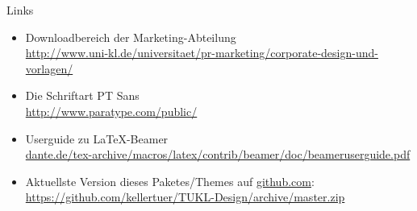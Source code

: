 \documentclass[german,10pt,xcolor=colortbl,compress
]{beamer}
\begin{document}
	\begin{frame}{Links}
		\begin{itemize}
			\item Downloadbereich der Marketing-Abteilung\\ \href{http://www.uni-kl.de/universitaet/pr-marketing/corporate-design-und-vorlagen/}{http://www.uni-kl.de/universitaet/pr-marketing/corporate-design-und-vorlagen/}
			\item Die Schriftart PT Sans\\
				\href{http://www.paratype.com/public/}{http://www.paratype.com/public/}
			\item Userguide zu \LaTeX-Beamer\\ \href{ftp://ftp.dante.de/tex-archive/macros/latex/contrib/beamer/doc/beameruserguide.pdf}{dante.de/tex-archive/macros/latex/contrib/beamer/doc/beameruserguide.pdf}
			\item Aktuellste Version dieses Paketes/Themes auf \href{http://github.com}{github.com}:\\
			\href{https://github.com/kellertuer/TUKL-Design/archive/master.zip}{https://github.com/kellertuer/TUKL-Design/archive/master.zip}
		\end{itemize}
	\end{frame}
\end{document}
